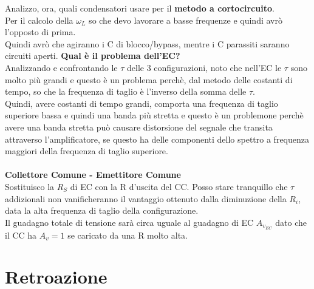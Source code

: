 \documentclass{article}
\begin{document}
Analizzo, ora, quali condensatori usare per il \textbf{metodo a cortocircuito}.\\
Per il calcolo della $ \omega_{L} $
so che devo lavorare a basse frequenze e quindi avrò l'opposto di prima.\\ Quindi avrò che agiranno i C di blocco/bypass, mentre i C parassiti saranno circuiti aperti.
\newpage
\noindent
\textbf{Qual è il problema dell'EC?} \\
Analizzando e confrontando le $ \tau $ delle 3 configurazioni, noto che nell'EC le $ \tau $ sono molto più grandi e questo è un problema perchè, dal metodo delle costanti di tempo, so che la frequenza di taglio è l'inverso della somma delle $ \tau.$ \\
Quindi, avere costanti di tempo grandi, comporta una frequenza di taglio superiore bassa e quindi una banda più stretta e questo è un problemone perchè avere una banda stretta può causare distorsione del segnale che transita attraverso l'amplificatore, se questo ha delle componenti dello spettro a frequenza maggiori della frequenza di taglio superiore. \\ \\
\textbf{Collettore Comune - Emettitore Comune}\\
Sostituisco la $R_{S}$ di EC con la R d'uscita del CC.
Posso stare tranquillo che $\tau$ addizionali non vanificheranno il vantaggio ottenuto dalla diminuzione della $R_{i}$, data la alta frequenza di taglio della configurazione.\\
Il guadagno totale di tensione sarà circa uguale al guadagno di EC $A_{v_{EC}}$  dato che il CC ha $A_{v}=1$ se caricato da una R molto alta.

\newpage
\section{Retroazione}
\end{document}
